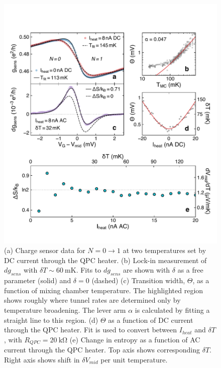\documentclass[twocolumn,showpacs,amsmath,amssymb,prl,aps,superscriptaddress]{revtex4-1}
\begin{document}
\begin{figure}[!]
        \includegraphics[width=1.0\columnwidth]{../figures/figure_2.pdf}
        \caption{\label{fig:fig2}(a) Charge sensor data for $N=0 \rightarrow 1$ at two temperatures set by DC current through the QPC heater. (b) Lock-in measurement of $dg_{sens}$ with $\delta T \sim \SI{60}{\milli\kelvin}$. Fits to $dg_{sens}$ are shown with $\delta$ as a free parameter (solid) and $\delta=0$ (dashed) (c) Transition width, $\Theta$, as a function of mixing chamber temperature. The highlighted region shows roughly where tunnel rates are determined only by temperature broadening. The lever arm $\alpha$ is calculated by fitting a straight line to this region. (d) $\Theta$ as a function of DC current through the QPC heater. Fit is used to convert between $I_{heat}$ and $\delta T$, with $R_{QPC} = \SI{20}{\kilo\ohm}$ (e) Change in entropy as a function of AC current through the QPC heater. Top axis shows corresponding $\delta T$. Right axis shows shift in $\delta V_{mid}$ per unit temperature.}
\end{figure}
\end{document}
